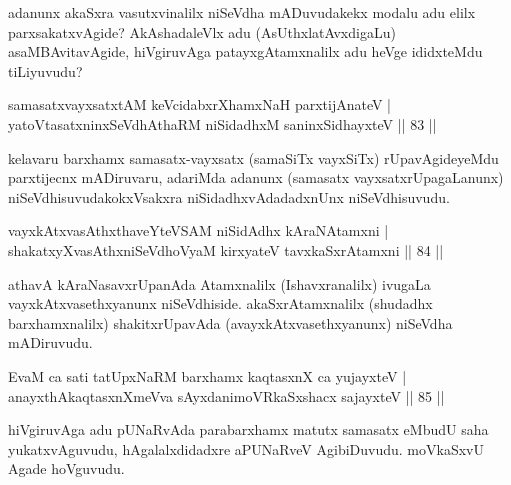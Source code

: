 \begin{artha}
adanunx akaSxra vasutxvinalilx niSeVdha mADuvudakekx modalu adu elilx parxsakatxvAgide? AkAshadaleVlx adu (AsUthxlatAvxdigaLu) asaMBAvitavAgide, hiVgiruvAga patayxgAtamxnalilx adu heVge ididxteMdu tiLiyuvudu?
\end{artha}


\begin{shl}
samasatxvayxsatxtAM keVcidabxrXhamxNaH parxtijAnateV |\\
yatoV\s tasatxninxSeVdhAthaRM niSidadhxM saninxSidhayxteV \hfill || 83 ||
\end{shl}

\begin{artha}
kelavaru barxhamx samasatx-vayxsatx (samaSiTx vayxSiTx) rUpavAgideyeMdu parxtijecnx mADiruvaru, adariMda adanunx (samasatx vayxsatxrUpagaLanunx) niSeVdhisuvudakokxVsakxra niSidadhxvAdadadxnUnx niSeVdhisuvudu.
\end{artha}

\begin{shl}
vayxkAtxvasAthx\s thaveYteVSAM niSidAdhx kAraNAtamxni |\\
shakatxyXvasAthxniSeVdhoV\s yaM kirxyateV tavxkaSxrAtamxni \hfill || 84 ||
\end{shl}

\begin{artha}
athavA kAraNasavxrUpanAda Atamxnalilx (Ishavxranalilx) ivugaLa vayxkAtxvasethxyanunx niSeVdhiside. akaSxrAtamxnalilx (shudadhx barxhamxnalilx) shakitxrUpavAda (avayxkAtxvasethxyanunx) niSeVdha mADiruvudu.
\end{artha}


\begin{shl}
EvaM ca sati tatUpxNaRM barxhamx kaqtasxnX ca yujayxteV |\\
anayxthA\s kaqtasxnXmeVva sAyxdanimoVRkaSxshacx sajayxteV \hfill || 85 ||
\end{shl}

\begin{artha}
hiVgiruvAga adu pUNaRvAda parabarxhamx matutx samasatx eMbudU saha yukatxvAguvudu, hAgalalxdidadxre aPUNaRveV AgibiDuvudu. moVkaSxvU Agade hoVguvudu. 
\end{artha}


